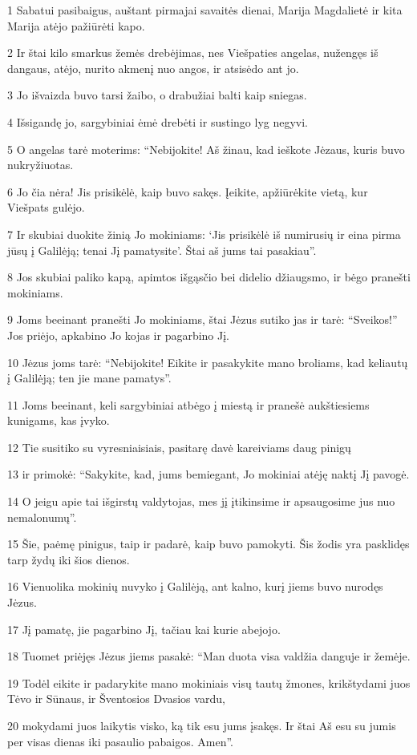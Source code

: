 \par 1 Sabatui pasibaigus, auštant pirmajai savaitės dienai, Marija Magdalietė ir kita Marija atėjo pažiūrėti kapo. 
\par 2 Ir štai kilo smarkus žemės drebėjimas, nes Viešpaties angelas, nužengęs iš dangaus, atėjo, nurito akmenį nuo angos, ir atsisėdo ant jo. 
\par 3 Jo išvaizda buvo tarsi žaibo, o drabužiai balti kaip sniegas. 
\par 4 Išsigandę jo, sargybiniai ėmė drebėti ir sustingo lyg negyvi. 
\par 5 O angelas tarė moterims: “Nebijokite! Aš žinau, kad ieškote Jėzaus, kuris buvo nukryžiuotas. 
\par 6 Jo čia nėra! Jis prisikėlė, kaip buvo sakęs. Įeikite, apžiūrėkite vietą, kur Viešpats gulėjo. 
\par 7 Ir skubiai duokite žinią Jo mokiniams: ‘Jis prisikėlė iš numirusių ir eina pirma jūsų į Galilėją; tenai Jį pamatysite’. Štai aš jums tai pasakiau”. 
\par 8 Jos skubiai paliko kapą, apimtos išgąsčio bei didelio džiaugsmo, ir bėgo pranešti mokiniams. 
\par 9 Joms beeinant pranešti Jo mokiniams, štai Jėzus sutiko jas ir tarė: “Sveikos!” Jos priėjo, apkabino Jo kojas ir pagarbino Jį. 
\par 10 Jėzus joms tarė: “Nebijokite! Eikite ir pasakykite mano broliams, kad keliautų į Galilėją; ten jie mane pamatys”. 
\par 11 Joms beeinant, keli sargybiniai atbėgo į miestą ir pranešė aukštiesiems kunigams, kas įvyko. 
\par 12 Tie susitiko su vyresniaisiais, pasitarę davė kareiviams daug pinigų 
\par 13 ir primokė: “Sakykite, kad, jums bemiegant, Jo mokiniai atėję naktį Jį pavogė. 
\par 14 O jeigu apie tai išgirstų valdytojas, mes jį įtikinsime ir apsaugosime jus nuo nemalonumų”. 
\par 15 Šie, paėmę pinigus, taip ir padarė, kaip buvo pamokyti. Šis žodis yra pasklidęs tarp žydų iki šios dienos. 
\par 16 Vienuolika mokinių nuvyko į Galilėją, ant kalno, kurį jiems buvo nurodęs Jėzus. 
\par 17 Jį pamatę, jie pagarbino Jį, tačiau kai kurie abejojo. 
\par 18 Tuomet priėjęs Jėzus jiems pasakė: “Man duota visa valdžia danguje ir žemėje. 
\par 19 Todėl eikite ir padarykite mano mokiniais visų tautų žmones, krikštydami juos Tėvo ir Sūnaus, ir Šventosios Dvasios vardu, 
\par 20 mokydami juos laikytis visko, ką tik esu jums įsakęs. Ir štai Aš esu su jumis per visas dienas iki pasaulio pabaigos. Amen”.



